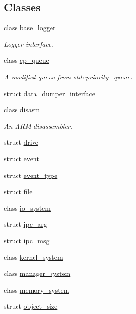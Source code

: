 \subsection*{Classes}
\begin{DoxyCompactItemize}
\item 
class \mbox{\hyperlink{classeka2l1_1_1base__logger}{base\+\_\+logger}}
\begin{DoxyCompactList}\small\item\em Logger interface. \end{DoxyCompactList}\item 
class \mbox{\hyperlink{classeka2l1_1_1cp__queue}{cp\+\_\+queue}}
\begin{DoxyCompactList}\small\item\em A modified queue from std\+::priority\+\_\+queue. \end{DoxyCompactList}\item 
struct \mbox{\hyperlink{structeka2l1_1_1data__dumper__interface}{data\+\_\+dumper\+\_\+interface}}
\item 
class \mbox{\hyperlink{classeka2l1_1_1disasm}{disasm}}
\begin{DoxyCompactList}\small\item\em An A\+RM disassembler. \end{DoxyCompactList}\item 
struct \mbox{\hyperlink{structeka2l1_1_1drive}{drive}}
\item 
struct \mbox{\hyperlink{structeka2l1_1_1event}{event}}
\item 
struct \mbox{\hyperlink{structeka2l1_1_1event__type}{event\+\_\+type}}
\item 
struct \mbox{\hyperlink{structeka2l1_1_1file}{file}}
\item 
class \mbox{\hyperlink{classeka2l1_1_1io__system}{io\+\_\+system}}
\item 
struct \mbox{\hyperlink{structeka2l1_1_1ipc__arg}{ipc\+\_\+arg}}
\item 
struct \mbox{\hyperlink{structeka2l1_1_1ipc__msg}{ipc\+\_\+msg}}
\item 
class \mbox{\hyperlink{classeka2l1_1_1kernel__system}{kernel\+\_\+system}}
\item 
class \mbox{\hyperlink{classeka2l1_1_1manager__system}{manager\+\_\+system}}
\item 
class \mbox{\hyperlink{classeka2l1_1_1memory__system}{memory\+\_\+system}}
\item 
struct \mbox{\hyperlink{structeka2l1_1_1object__size}{object\+\_\+size}}

\end{DoxyCompactItemize}
